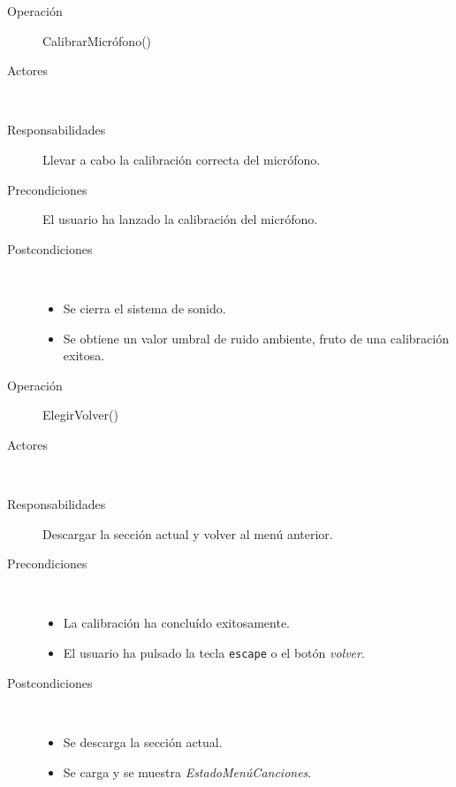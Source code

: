 \begin{description}
\item[Operación] CalibrarMicrófono()
\item[Actores] \jugador\, \sistema\
\item[Responsabilidades] Llevar a cabo la calibración correcta del micrófono.
\item[Precondiciones] El usuario ha lanzado la calibración del micrófono.
\item[Postcondiciones] $\quad$
  \begin{itemize}
  \item Se cierra el sistema de sonido.
  \item Se obtiene un valor umbral de ruido ambiente, fruto de una calibración
    exitosa.
  \end{itemize}
\end{description}

\begin{description}
\item[Operación] ElegirVolver()
\item[Actores] \jugador\, \sistema\
\item[Responsabilidades] Descargar la sección actual y volver al menú anterior.
\item[Precondiciones] $\quad$
  \begin{itemize}
  \item La calibración ha concluído exitosamente.
  \item El usuario ha pulsado la tecla \texttt{escape} o el botón \textit{volver}.
  \end{itemize}
\item[Postcondiciones] $\quad$
  \begin{itemize}
  \item Se descarga la sección actual.
  \item Se carga y se muestra \textit{EstadoMenúCanciones}.
  \end{itemize}
\end{description}

